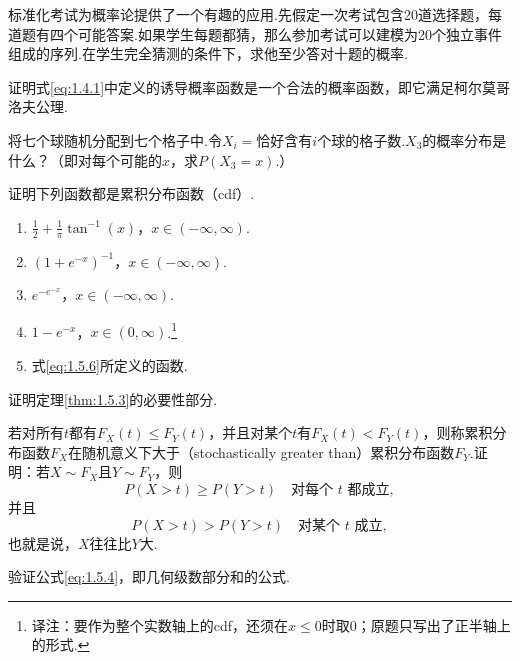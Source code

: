 \begin{exercise}\label{exercise:1.44}
标准化考试为概率论提供了一个有趣的应用.先假定一次考试包含20道选择题，每道题有四个可能答案.如果学生每题都猜，那么参加考试可以建模为20个独立事件组成的序列.在学生完全猜测的条件下，求他至少答对十题的概率.
\end{exercise}

\begin{exercise}\label{exercise:1.45}
证明式\eqref{eq:1.4.1}中定义的诱导概率函数是一个合法的概率函数，即它满足柯尔莫哥洛夫公理.
\end{exercise}

\begin{exercise}\label{exercise:1.46}
将七个球随机分配到七个格子中.令$X_i=$恰好含有$i$个球的格子数.$X_3$的概率分布是什么？（即对每个可能的$x$，求$P(X_3=x)$.）
\end{exercise}

\begin{exercise}\label{exercise:1.47}
证明下列函数都是累积分布函数（cdf）.
\begin{enumerate}
\item[(a)] $\frac12+\frac1\pi\tan^{-1}(x)$，$x\in(-\infty,\infty)$.
\item[(b)] $(1+e^{-x})^{-1}$，$x\in(-\infty,\infty)$.
\item[(c)] $e^{-e^{-x}}$，$x\in(-\infty,\infty)$.
\item[(d)] $1-e^{-x}$，$x\in(0,\infty)$.\footnote{译注：要作为整个实数轴上的cdf，还须在$x\le0$时取0；原题只写出了正半轴上的形式.}
\item[(e)] 式\eqref{eq:1.5.6}所定义的函数.
\end{enumerate}
\end{exercise}

\begin{exercise}\label{exercise:1.48}
证明定理\ref{thm:1.5.3}的必要性部分.
\end{exercise}

\begin{exercise}\label{exercise:1.49}
若对所有$t$都有$F_X(t)\le F_Y(t)$，并且对某个$t$有$F_X(t)<F_Y(t)$，则称累积分布函数$F_X$在随机意义下大于（stochastically greater than）累积分布函数$F_Y$.证明：若$X\sim F_X$且$Y\sim F_Y$，则
$$
P(X>t)\ge P(Y>t)\quad\text{对每个 }t\text{ 都成立},
$$
并且
$$
P(X>t)>P(Y>t)\quad\text{对某个 }t\text{ 成立},
$$
也就是说，$X$往往比$Y$大.
\end{exercise}

\begin{exercise}\label{exercise:1.50}
验证公式\eqref{eq:1.5.4}，即几何级数部分和的公式.
\end{exercise}

